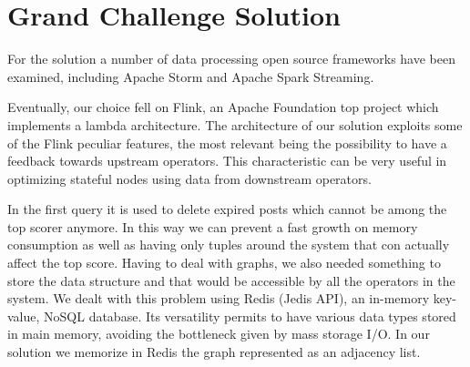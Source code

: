\section{Grand Challenge Solution}
For the solution a number of data processing open source frameworks have been examined, including Apache Storm and Apache Spark Streaming.

Eventually, our choice fell on Flink, an Apache Foundation top project which implements a lambda architecture. The architecture of our solution exploits some of the Flink peculiar features, the most relevant being the possibility to have a feedback towards upstream operators. This characteristic can be very useful in optimizing stateful nodes using data from downstream operators. 

In the first query it is used to delete expired posts which cannot be among the top scorer anymore. In this way we can prevent a fast growth on memory consumption as well as having only tuples around the system that con actually affect the top score. Having to deal with graphs, we also needed something to store the data structure and that would be accessible by all the operators in the system. We dealt with this problem using Redis (Jedis API), an in-memory key-value, NoSQL database. Its versatility permits to have various data types stored in main memory, avoiding the bottleneck given by mass storage I/O. In our solution we memorize in Redis the graph represented as an adjacency list.